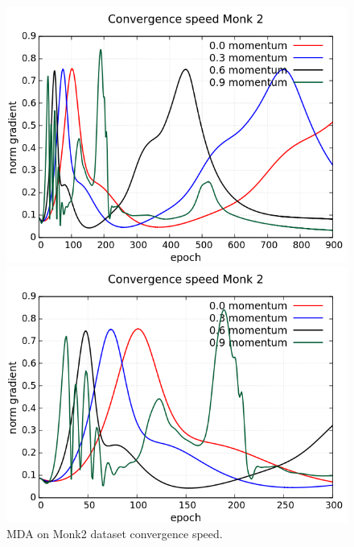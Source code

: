 \begin{figure}[H]
	\centering
	\begin{minipage}[t]{0.5\linewidth}
		\includegraphics[width=\linewidth]{data/MGD/Monk2/M/Monk2_MGD_CS_standard.png}
	\end{minipage}%
	\begin{minipage}[t]{0.5\linewidth}
		\includegraphics[width=\linewidth]{data/MGD/Monk2/M/Monk2_MGD_CS_zoom.png}
	\end{minipage}
	\caption{MDA on Monk2 dataset convergence speed.}
\end{figure}
